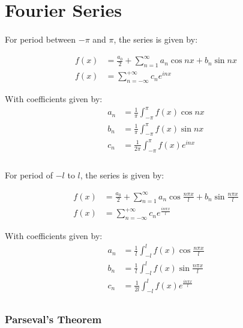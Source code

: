 \documentclass[12pt]{article}
\begin{document}
\section{Fourier Series}

\paragraph{}
For period between $-\pi$ and $\pi$, the series is given by:

\begin{align*}
    f(x) &= \frac{a_0}{2} + \sum_{n=1}^{\infty} a_n \cos{nx} + b_n \sin{nx}\\
    f(x) &= \sum_{n=-\infty}^{+\infty} c_n e^{inx}
\end{align*}

With coefficients given by:
\begin{align*}
    a_n &= \frac{1}{\pi} \int^{\pi}_{-\pi}f(x)\cos{nx}\\
    b_n &= \frac{1}{\pi} \int^{\pi}_{-\pi}f(x)\sin{nx}\\
    c_n &= \frac{1}{2\pi} \int^{\pi}_{-\pi}f(x)e^{inx}\\
\end{align*}

\paragraph{}
For period of $-l$ to $l$, the series is given by:

\begin{align*}
    f(x) &= \frac{a_0}{2} + \sum_{n=1}^{\infty} a_n \cos{\frac{n\pi x}{l}} + b_n \sin{\frac{n\pi x}{l}}\\
    f(x) &= \sum_{n=-\infty}^{+\infty} c_n e^{\frac{in\pi x}{l}}
\end{align*}

With coefficients given by:
\begin{align*}
    a_n &= \frac{1}{l} \int^{l}_{-l}f(x)\cos{\frac{n\pi x}{l}}\\
    b_n &= \frac{1}{l} \int^{l}_{-l}f(x)\sin{\frac{n\pi x}{l}}\\
    c_n &= \frac{1}{2l} \int^{l}_{-l}f(x)e^{\frac{in\pi x}{l}}\\
\end{align*}

\subsubsection{Parseval's Theorem}
\end{document}
